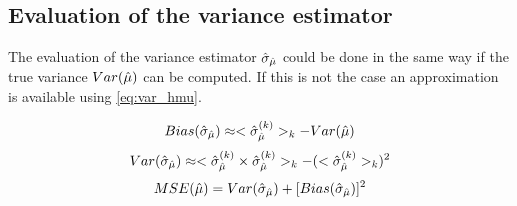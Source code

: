 \subsection{Evaluation of the variance estimator} %
\label{sub:evaluation_of_the_variance_estimator}

The evaluation of the variance estimator $\hat\sigma_{\hat\mu}$ could be done in the same way if the true variance $Var(\hat\mu)$ can be computed.
If this is not the case an approximation is available using \autoref{eq:var_hmu}.

\begin{equation}
	Bias(\hat\sigma_{\hat\mu}) \approx <\hat\sigma_{\hat\mu}^{(k)}>_k - Var(\hat\mu)
\end{equation}
\begin{equation}
	Var(\hat\sigma_{\hat\mu}) \approx <\hat\sigma_{\hat\mu}^{(k)} \times \hat\sigma_{\hat\mu}^{(k)}>_k - (<\hat\sigma_{\hat\mu}^{(k)}>_k)^2
\end{equation}
\begin{equation}
	MSE(\hat\mu) = Var(\hat\sigma_{\hat\mu}) + [Bias(\hat\sigma_{\hat\mu})]^2
\end{equation}


